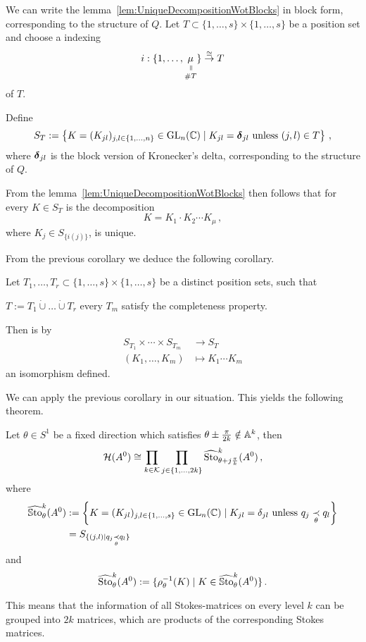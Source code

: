 \begin{cor}
  We can write the lemma~\ref{lem:UniqueDecompositionWotBlocks} in block form,
  corresponding to the structure of $Q$.
  Let $T\subset\{1,\dots,s\}\times\{1,\dots,s\}$ be a position set and choose a
  indexing 
  \[
    i:\{1,\dots, \underset{\#T}{\underset{%
      \text{\rotatebox[origin=c]{-90}{$=$}}}{\mu}}\}\overset{\cong}{\to}T
  \]
  of $T$.
  \begin{s-defn}
    Define
    \[
      S_T:=\left\{K=(K_{jl})_{j,l\in\{1,\dots,n\}}\in\operatorname{GL}_n(\mathbb{C})\mid
      K_{jl}=\boldsymbol{\delta}_{jl} \text{~unless~} (j,l)\in T \right\} \,,
    \]
    where $\boldsymbol{\delta}_{jl}$ is the block version of Kronecker's delta,
    corresponding to the structure of $Q$.
  \end{s-defn}
  From the lemma~\ref{lem:UniqueDecompositionWotBlocks} then follows that for
  every $K\in S_T$ is the decomposition
  \[
    K=K_1\cdot K_2\cdots K_\mu \,,
  \]
  where $K_j\in S_{\{i(j)\}}$, is unique.
\end{cor}
From the previous corollary we deduce the following corollary.
\begin{cor}\label{cor:composeLevelwise}
  Let $T_1,\dots,T_r\subset\{1,\dots,s\}\times\{1,\dots,s\}$ be a distinct
  position sets, such that
  \begin{einr}
    $T:=T_1\dot\cup\dots\dot\cup T_r$  every $T_m$ satisfy
    the completeness property.
  \end{einr}
  Then is by
  \begin{align*}
    S_{T_1}\times\cdots\times S_{T_m} &\longrightarrow S_T
  \\(K_1,\dots,K_m) &\longmapsto K_1\cdots K_m
  \end{align*}
  an isomorphism defined.
\end{cor}
We can apply the previous corollary in our situation. This yields the following
theorem.
\begin{thm}
  Let $\theta\in S^1$ be a fixed direction which satisfies
  $\theta\pm\frac{\pi}{2k}\notin\mathbb{A}^k$, then
  \[
    \mathcal{H}(A^0)\cong\prod_{k\in\mathcal{K}}\prod_{j\in\{1,\dots,2k\}}
    \widehat{\operatorname{Sto}}_{\theta+j\frac{\pi}{k}}^k(A^0) \,,
  \]
  where
  \begin{align*}
    \widehat{\operatorname{\mathbb{S}to}}_{\theta}^k(A^0)
      &:= \left\{K=(K_{jl})_{j,l\in\{1,\dots,s\}}\in\operatorname{GL}_n(\mathbb{C})\mid
        K_{jl}=\delta_{jl} \text{~unless~}
        q_j \underset{\theta}{\prec} q_l \right\}
    \\&=S_{\{(j,l) \mid q_j \underset{\theta}{\prec} q_l \}}
  \end{align*}
  and
  \[
    \widehat{\operatorname{Sto}}_{\theta}^k(A^0):=\{\rho_\theta^{-1}(K) 
      \mid K\in\widehat{\operatorname{\mathbb{S}to}}_{\theta}^k(A^0) \} \,.
  \]
  \begin{s-rem}
    This means that the information of all Stokes-matrices on every level $k$
    can be grouped into $2k$ matrices, which are products of the corresponding
    Stokes matrices.
  \end{s-rem}
\end{thm}
